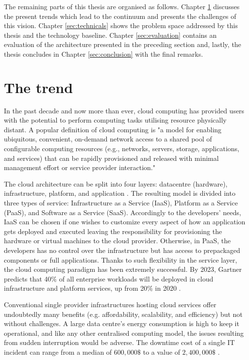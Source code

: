 The remaining parts of this thesis are organised as follows. Chapter \ref{sec:challenges} discusses the present trends which lead to the continuum and presents the challenges of this vision. Chapter \ref{sec:technicals} shows the problem space addressed by this thesis and the technology baseline. Chapter \ref{sec:evaluation} contains an evaluation of the architecture presented in the preceding section and, lastly, the thesis concludes in Chapter \ref{sec:conclusion} with the final remarks.

\section{The trend}
\label{sec:challenges}

In the past decade and now more than ever, cloud computing has provided users with the potential to perform computing tasks utilising resource physically distant. A popular definition of cloud computing \cite{cloud-def} is "a model for enabling ubiquitous, convenient, on-demand network access to a shared pool of configurable computing resources (e.g., networks, servers, storage, applications, and services) that can be rapidly provisioned and released with minimal management effort or service provider interaction."

The cloud architecture can be split into four layers: datacentre (hardware), infrastructure, platform, and application \cite{cloud-computing}. The resulting model is divided into three types of service: Infrastructure as a Service (IaaS), Platform as a Service (PaaS), and Software as a Service (SaaS). Accordingly to the developers' needs, IaaS can be chosen if one wishes to customize every aspect of how an application gets deployed and executed leaving the responsibility for provisioning the hardware or virtual machines to the cloud provider. Otherwise, in PaaS, the developers has no control over the infrastructure but has access to prepackaged components or full applications. Thanks to such flexibility in the service layer, the cloud computing paradigm has been extremely successful. By 2023, Gartner predicts that 40\% of all enterprise workloads will be deployed in cloud infrastructure and platform services, up from 20\% in 2020 \cite{gartner-cloud-edge}.

Conventional single provider infrastructures hosting cloud services offer undoubtedly many benefits (e.g. affordability, scalability, and efficiency) but not without challenges. A large data centre's energy consumption is high to keep it operational, and like any other centralised computing model, the issues resulting from sudden interruption would be adverse. The downtime cost of a single IT incident can range from a median of $600,000\$$ to a value of $2,400,000\$$ \cite{downtime-cost}.

